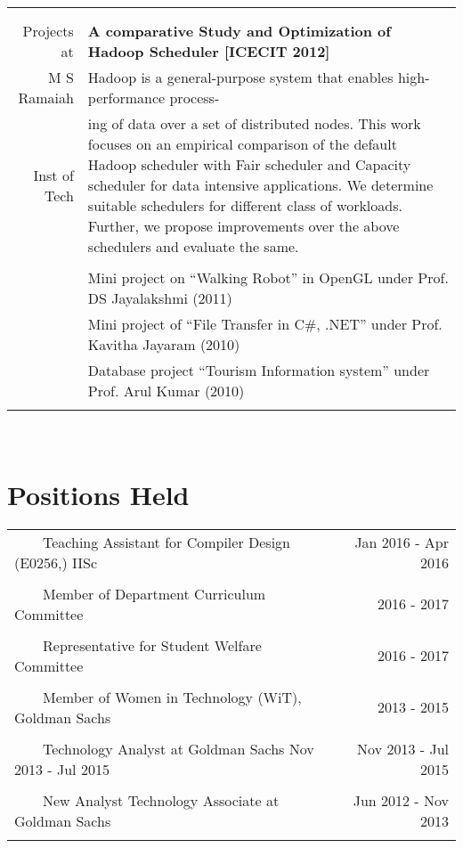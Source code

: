 \documentclass[a4paper,10pt]{article} %
\newcommand{\tabitem}{~~\llap{\textbullet}~~}
\begin{document}
\begin{tabular}{rp{13cm}}
&\\
&\\
Projects at & \textbf{A comparative Study and Optimization of Hadoop Scheduler [ICECIT 2012]}\\ 
M S Ramaiah & \setlength{\leftskip}{0.4cm} Hadoop is a general-purpose system that enables high-performance process-\\
Inst of Tech & \setlength{\leftskip}{0.4cm}
ing  of data over a set of distributed nodes. This work focuses on an empirical comparison of the default Hadoop scheduler with Fair scheduler and Capacity scheduler for data intensive applications. We determine suitable schedulers for different class of workloads. Further, we propose improvements over the above schedulers and evaluate  the same.\\ 
& \\
& Mini project on “Walking Robot” in OpenGL under Prof. DS Jayalakshmi (2011)\\ 
& Mini project of “File Transfer in C\#, .NET” under Prof. Kavitha Jayaram (2010)\\
& Database project “Tourism Information system” under Prof. Arul Kumar (2010)\\
& \\
\end{tabular}
\\


\section{Positions Held}

\begin{tabular}{p{12cm}r}
\tabitem Teaching Assistant for Compiler Design (E0256,) IISc  & Jan 2016 - Apr 2016 \\
&\\
\tabitem Member of Department Curriculum Committee &  2016 - 2017\\
&\\
\tabitem Representative for Student Welfare Committee  & 2016 - 2017\\
&\\
\tabitem Member of Women in Technology (WiT), Goldman Sachs  & 2013 - 2015\\
&\\
\tabitem Technology Analyst at Goldman Sachs Nov 2013 - Jul 2015 & Nov 2013 - Jul 2015 \\
&\\
\tabitem New Analyst Technology Associate at Goldman Sachs & Jun 2012 - Nov 2013 \\
&\\
\end{tabular}
\end{document}
